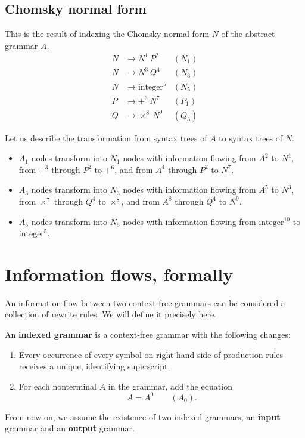 \documentclass{amsart}
\gdef\R{\rightarrow}
\begin{document}
\subsection{Chomsky normal form}

This is the result of indexing the Chomsky normal form $N$ of the
abstract grammar $A$.
\begin{align*}
N &\R N^1~P^2 & (N_1) \\
N &\R N^3~Q^4 & (N_3) \\
N &\R \mbox{integer}^5 & (N_5) \\
P &\R +^6~N^7 & (P_1) \\
Q &\R \times^8~N^9 & (Q_3)
\end{align*}

Let us describe the transformation from syntax trees of $A$ to
syntax trees of $N$.
\begin{itemize}
\item $A_1$ nodes transform into $N_1$ nodes with information
flowing from $A^2$ to $N^1$, from $+^3$ through $P^2$ to $+^6$,
and from $A^4$ through $P^2$ to $N^7$.
\item $A_3$ nodes transform into $N_3$ nodes with information
flowing from $A^5$ to $N^3$, from $\times^7$ through $Q^4$ to
$\times^8$, and from $A^8$ through $Q^4$ to $N^9$.
\item $A_5$ nodes transform into $N_5$ nodes with information
flowing from $\mbox{integer}^{10}$ to $\mbox{integer}^5$.
\end{itemize}

\section{Information flows, formally}

An information flow between two context-free grammars can be
considered a collection of rewrite rules. We will define it
precisely here.

An \textbf{indexed grammar} is a context-free grammar with the
following changes:
\begin{enumerate}
\item Every occurrence of every symbol on right-hand-side of
production rules receives a unique, identifying superscript.
\item For each nonterminal $A$ in the grammar, add the equation
\[
A=A^0\qquad(A_0).
\]
\end{enumerate}

From now on, we assume the existence of two indexed grammars, an
\textbf{input} grammar and an \textbf{output} grammar.
\end{document}
